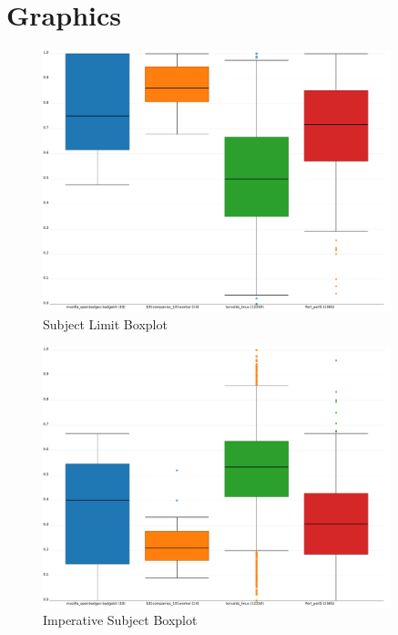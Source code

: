 \section{Graphics}
\label{sec:graphics}

\begin{figure}[h]
    \centering
    \includegraphics[width=0.9\textwidth]{img/subject_limit.pdf}
    \caption{Subject Limit Boxplot}
    \label{fig:bp_subject_limit}
\end{figure}

\begin{figure}[h]
    \centering
    \includegraphics[width=0.9\textwidth]{img/imperative_subject.pdf}
    \caption{Imperative Subject Boxplot}
    \label{fig:bp_imperative_subject}
\end{figure}

